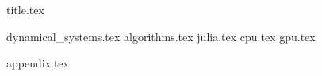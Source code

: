 \documentclass[12pt,a4paper,twoside]{article}
\numberwithin{figure}{section}
\numberwithin{equation}{section}
\theoremstyle{definition}
\theoremstyle{remark}
\theoremstyle{remark}
\begin{document}
{title.tex}

\pagestyle{headings}
\raggedbottom

{dynamical_systems.tex}
{algorithms.tex}
{julia.tex}
{cpu.tex}
{gpu.tex}

\newpage
{}
{appendix.tex}

\printbibliography
\end{document}
